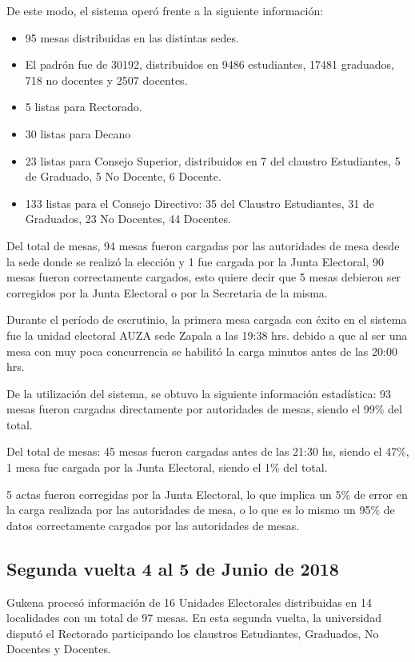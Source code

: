 De este modo, el sistema operó frente a la siguiente información:
\begin{itemize}
    \item 95 mesas distribuidas en las distintas sedes.
     \item El padrón fue de  30192, distribuidos en 9486 estudiantes, 17481 graduados, 718 no docentes y 2507 docentes.
     \item 5 listas para Rectorado.
     \item 30 listas para Decano
    \item 23 listas para Consejo Superior, distribuidos en 7 del claustro Estudiantes, 5 de Graduado, 5 No Docente, 6 Docente.
    \item 133 listas para el Consejo Directivo: 35 del Claustro Estudiantes, 31 de Graduados, 23 No Docentes, 44 Docentes.
\end{itemize}
Del total de mesas, 94 mesas fueron cargadas por las autoridades de mesa desde la sede donde se realizó la elección y 1 fue cargada por la Junta Electoral, 90 mesas fueron correctamente cargados, esto quiere decir que 5 mesas debieron ser corregidos por la Junta Electoral o por la Secretaria de la misma.

Durante el período de escrutinio, la primera mesa cargada con éxito en el sistema fue la unidad electoral AUZA sede Zapala a las 19:38 hrs. debido a que al ser una mesa con muy poca concurrencia se habilitó la carga minutos antes de las 20:00 hrs.

De la utilización del sistema, se obtuvo la siguiente información estadística:
93 mesas fueron cargadas directamente por autoridades de mesas, siendo el 99\% del total.

Del total de mesas:
45 mesas fueron cargadas antes de las 21:30 hs, siendo el 47\%,
1 mesa fue cargada 	por la Junta Electoral, siendo el 1\% del total.

5 actas fueron corregidas por la Junta Electoral, lo que implica un 5\% de error en la carga realizada por las autoridades de mesa, o lo que es lo mismo un 95\% de datos correctamente cargados por las autoridades de mesas.

\subsection{Segunda vuelta 4 al 5 de Junio de 2018}
Gukena procesó información de 16 Unidades Electorales distribuidas en 14 localidades con un total de 97 mesas. En esta segunda vuelta, la universidad disputó el Rectorado participando los claustros Estudiantes, Graduados, No Docentes y Docentes.

